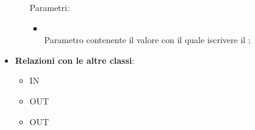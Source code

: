 \begin{itemize}
\begin{itemize}
		Parametri:
		\begin{itemize}
			\item {} \\
			Parametro contenente il valore con il quale iscrivere il ;
		\end{itemize}
	\end{itemize}
	\item \textbf{Relazioni con le altre classi}:
	\begin{itemize}
		\item IN \hyperlink{ConversationDispatcher_label}{}
		\item OUT \hyperlink{ConversationAction_label}{}
		\item OUT \hyperlink{ConversationActionObserver_label}{}
	\end{itemize}
\end{itemize}
\FloatBarrier

